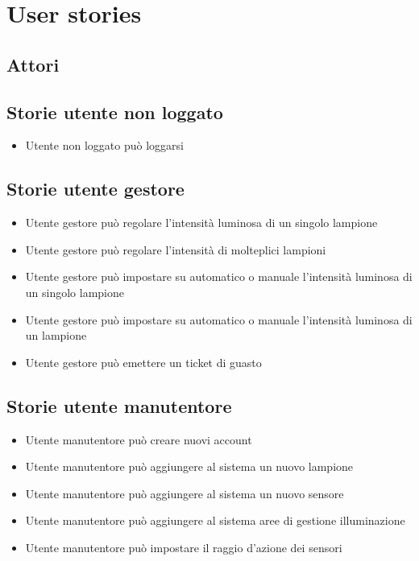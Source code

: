 \chapter{User stories}

\section{Attori}\label{attori}

\section{Storie utente non loggato}

\begin{itemize}
    \item Utente non loggato può loggarsi
\end{itemize}

\section{Storie utente gestore}

\begin{itemize}
    \item Utente gestore può regolare l'intensità luminosa di un singolo lampione
    \item Utente gestore può regolare l'intensità di molteplici lampioni
    \item Utente gestore può impostare su automatico o manuale l'intensità luminosa di un singolo lampione
    \item Utente gestore può impostare su automatico o manuale l'intensità luminosa di un lampione
    \item Utente gestore può emettere un ticket di guasto
\end{itemize}



\section{Storie utente manutentore}
\begin{itemize}
    \item Utente manutentore può creare nuovi account
    \item Utente manutentore può aggiungere al sistema un nuovo lampione
    \item Utente manutentore può aggiungere al sistema un nuovo sensore
    \item Utente manutentore può aggiungere al sistema aree di gestione illuminazione
    \item Utente manutentore può impostare il raggio d'azione dei sensori
\end{itemize}


